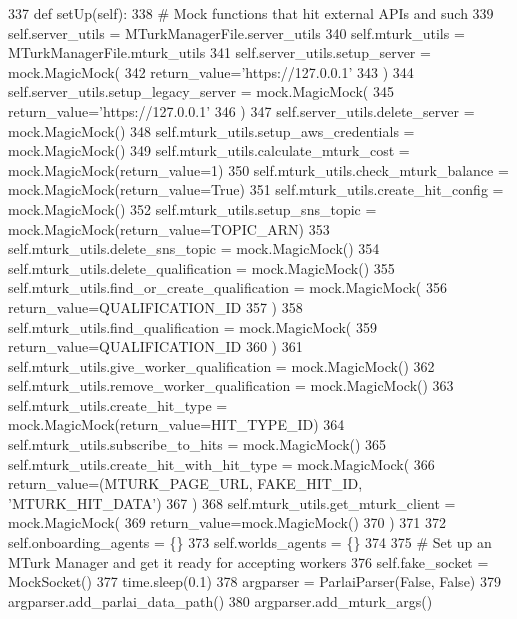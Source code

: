 \begin{DoxyCode}
337     \textcolor{keyword}{def }setUp(self):
338         \textcolor{comment}{# Mock functions that hit external APIs and such}
339         self.server\_utils = MTurkManagerFile.server\_utils
340         self.mturk\_utils = MTurkManagerFile.mturk\_utils
341         self.server\_utils.setup\_server = mock.MagicMock(
342             return\_value=\textcolor{stringliteral}{'https://127.0.0.1'}
343         )
344         self.server\_utils.setup\_legacy\_server = mock.MagicMock(
345             return\_value=\textcolor{stringliteral}{'https://127.0.0.1'}
346         )
347         self.server\_utils.delete\_server = mock.MagicMock()
348         self.mturk\_utils.setup\_aws\_credentials = mock.MagicMock()
349         self.mturk\_utils.calculate\_mturk\_cost = mock.MagicMock(return\_value=1)
350         self.mturk\_utils.check\_mturk\_balance = mock.MagicMock(return\_value=\textcolor{keyword}{True})
351         self.mturk\_utils.create\_hit\_config = mock.MagicMock()
352         self.mturk\_utils.setup\_sns\_topic = mock.MagicMock(return\_value=TOPIC\_ARN)
353         self.mturk\_utils.delete\_sns\_topic = mock.MagicMock()
354         self.mturk\_utils.delete\_qualification = mock.MagicMock()
355         self.mturk\_utils.find\_or\_create\_qualification = mock.MagicMock(
356             return\_value=QUALIFICATION\_ID
357         )
358         self.mturk\_utils.find\_qualification = mock.MagicMock(
359             return\_value=QUALIFICATION\_ID
360         )
361         self.mturk\_utils.give\_worker\_qualification = mock.MagicMock()
362         self.mturk\_utils.remove\_worker\_qualification = mock.MagicMock()
363         self.mturk\_utils.create\_hit\_type = mock.MagicMock(return\_value=HIT\_TYPE\_ID)
364         self.mturk\_utils.subscribe\_to\_hits = mock.MagicMock()
365         self.mturk\_utils.create\_hit\_with\_hit\_type = mock.MagicMock(
366             return\_value=(MTURK\_PAGE\_URL, FAKE\_HIT\_ID, \textcolor{stringliteral}{'MTURK\_HIT\_DATA'})
367         )
368         self.mturk\_utils.get\_mturk\_client = mock.MagicMock(
369             return\_value=mock.MagicMock()
370         )
371 
372         self.onboarding\_agents = \{\}
373         self.worlds\_agents = \{\}
374 
375         \textcolor{comment}{# Set up an MTurk Manager and get it ready for accepting workers}
376         self.fake\_socket = MockSocket()
377         time.sleep(0.1)
378         argparser = ParlaiParser(\textcolor{keyword}{False}, \textcolor{keyword}{False})
379         argparser.add\_parlai\_data\_path()
380         argparser.add\_mturk\_args()

\end{DoxyCode}
